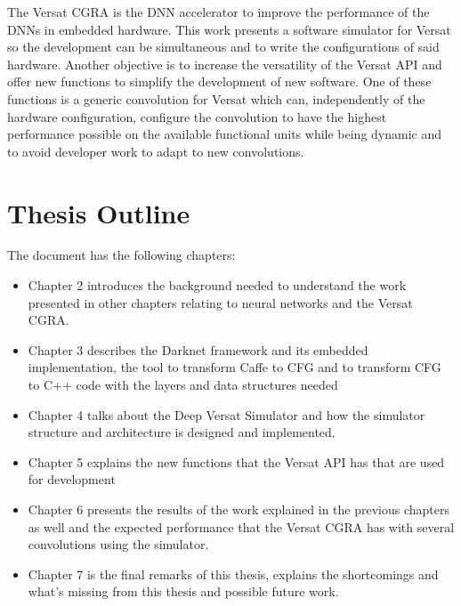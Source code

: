 The Versat CGRA is the DNN accelerator to improve the performance of the DNNs in embedded hardware.
This work presents a software simulator for Versat so the development can be simultaneous and
to write the configurations of said hardware.
Another objective is to increase the versatility of the Versat API and offer new functions
to simplify the development of new software. One of these functions is a generic convolution for
Versat which can, independently of the hardware configuration, configure the convolution to have
the highest performance possible on the available functional units while being dynamic and
to avoid developer work to adapt to new convolutions.






\section{Thesis Outline}
\label{reportoutline}

The document has the following chapters:

\begin{itemize}
	\item Chapter 2 introduces the background needed to understand the work presented in other 
chapters relating to neural networks and the Versat CGRA.
	\item Chapter 3 describes the Darknet framework and its embedded implementation, the tool
to transform Caffe to CFG and to transform CFG to C++ code with the layers and data structures needed
	\item Chapter 4 talks about the Deep Versat Simulator and how the simulator structure 
and architecture is designed and implemented.
	\item Chapter 5 explains the new functions that the Versat API has that are used for
development
	\item Chapter 6 presents the results of the work explained in the previous chapters as well
and the expected performance that the Versat CGRA has with several convolutions using the
simulator.
	\item Chapter 7 is the final remarks of this thesis, explains the shortcomings and what's missing
from this thesis and possible future work.
  \end{itemize}


